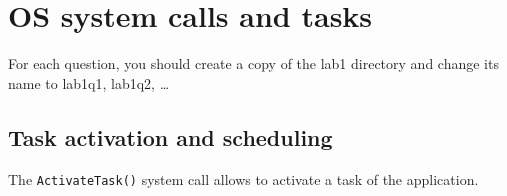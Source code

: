 \documentclass[11pt]{report}
\begin{document}




\section{OS system calls and tasks}

For each question, you should create a copy of the lab1 directory and change its name to lab1q1, lab1q2, \ldots

\subsection{Task activation and scheduling}

The \texttt{ActivateTask()} system call allows to activate a task of the application.
\end{document}
